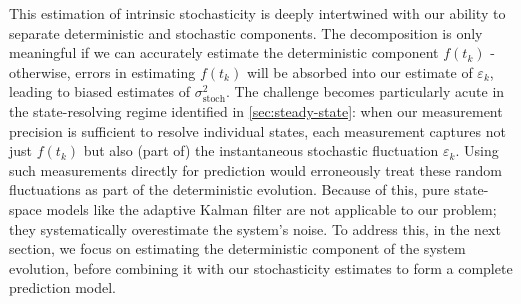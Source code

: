 \documentclass[9pt, twocolumn,superscriptaddress]{revtex4}
\begin{document}
This estimation of intrinsic stochasticity is deeply intertwined with our ability to separate deterministic and stochastic components. The decomposition is only meaningful if we can accurately estimate the deterministic component $f(t_k)$ - otherwise, errors in estimating $f(t_k)$ will be absorbed into our estimate of $\varepsilon_k$, leading to biased estimates of $\sigma^2_\text{stoch}$. The challenge becomes particularly acute in the state-resolving regime identified in \cref{sec:steady-state}: when our measurement precision is sufficient to resolve individual states, each measurement captures not just $f(t_k)$ but also (part of) the instantaneous stochastic fluctuation $\varepsilon_k$. Using such measurements directly for prediction would erroneously treat these random fluctuations as part of the deterministic evolution. Because of this, pure state-space models like the adaptive Kalman filter \cite{mohamed1999adaptive} are not applicable to our problem; they systematically overestimate the system's noise. To address this, in the next section, we focus on estimating the deterministic component of the system evolution, before combining it with our stochasticity estimates to form a complete prediction model.
\end{document}
